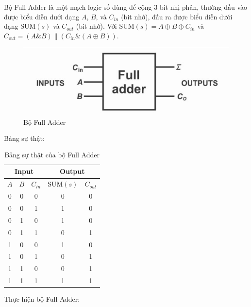 Bộ Full Adder là một mạch logic số dùng để cộng 3-bit nhị phân, thường đầu vào được biểu diễn dưới dạng $A$, $B$, và $C_{in}$ (bit nhớ), đầu ra được biểu diễn dưới dạng $\text{SUM}(s)$ và $C_{out}$ (bit nhớ). Với $\text{SUM}(s) = A \oplus B \oplus C_{in}$ và $C_{out} = (A \& B) \| (C_{in} \& (A \oplus B))$.

\begin{figure}[H]
	\includegraphics[width = 0.5\linewidth]{./image/full adder block.png}
	\centering
	\caption{Bộ Full Adder}
	\label{f_full adder block}	
\end{figure}

Bảng sự thật:

\begin{table}[H]
	\centering
	\begin{tabular}{|c|c|c|c|c|}
		\hline
		\multicolumn{3}{|c|}{Input} & \multicolumn{2}{c|}{Output}\\
		\hline
		$A$ & $B$ & $C_{in}$ & $\text{SUM}(s)$ & $C_{out}$\\
		\hline
		0 & 0 & 0 & 0 & 0\\
		\hline
		0 & 0 & 1 & 1 & 0\\
		\hline
		0 & 1 & 0 & 1 & 0\\
		\hline
		0 & 1 & 1 & 0 & 1\\
		\hline
		1 & 0 & 0 & 1 & 0\\
		\hline
		1 & 0 & 1 & 0 & 1\\
		\hline
		1 & 1 & 0 & 0 & 1\\
		\hline
		1 & 1 & 1 & 1 & 1\\
		\hline
	\end{tabular}
	\caption{Bảng sự thật của bộ Full Adder}
	\label{t_true table}
\end{table}

Thực hiện bộ Full Adder:


